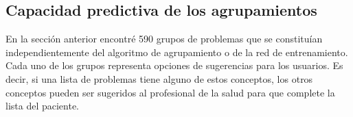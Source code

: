 \begin{table}[htb]
\centering
\caption{Agrupamientos recurrentes en la red \acrshort{RP-SCT} con el algoritmo \textit{Multilevel}}
\label{clus_ml}
\end{table}


\subsection{Capacidad predictiva de los agrupamientos}
En la sección anterior encontré 590 grupos de problemas que se constituían independientemente del algoritmo de agrupamiento o de la red de entrenamiento. Cada uno de los grupos  representa opciones de sugerencias para los usuarios. Es decir, si una lista de problemas tiene alguno de estos conceptos, los otros conceptos pueden ser sugeridos al profesional de la salud para que complete la lista del paciente.

